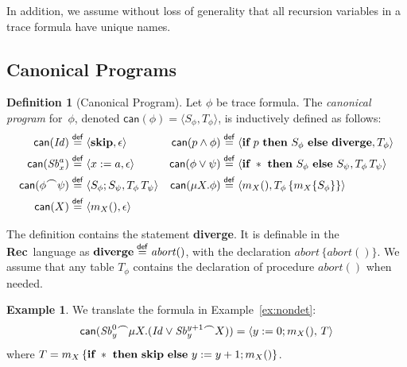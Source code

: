 \documentclass[10pt,a4paper]{amsart}
\theoremstyle{definition}
\newtheorem{definition}[theorem]{Definition}
\newtheorem{example}[theorem]{Example}
\newcommand{\defeq}{\stackrel{\mathsf{def}}{=}}
\newcommand{\fdenot}[1]{\left|\!\left|#1\right|\!\right|}
\newcommand{\chop}[0]{\raisebox{1ex}{$\frown$}}
\newcommand{\can}[1]{\mathsf{can} (#1)}
\newcommand{\Rec}{\mbox{\bf Rec}}
\newcommand{\Skip}{\mbox{\bf skip}}
\newcommand{\If}{\mbox{\bf if}}
\newcommand{\Then}{\mbox{\bf then}}
\newcommand{\Else}{\mbox{\bf else}}
\newcommand{\Any}{\mbox{\bf havoc}}
\newcommand{\Abort}{\mbox{\bf diverge}}
\begin{document}

In addition, we assume without loss of generality that all recursion
variables in a trace formula have unique names.


\subsection{Canonical Programs}
\label{sec:canonical-programs-1}

\begin{definition}[Canonical Program]
\label{def:can}
  Let $\phi$ be trace formula. The \emph{canonical program}
  for~$\phi$, denoted $\can{\phi}=\langle S_\phi,T_\phi\rangle$, is
  inductively defined as follows:
  \begin{align*}
    \can{\mathit{Id}} & \defeq \langle\Skip,\epsilon\rangle &
    \can{p\wedge\phi} & \defeq \langle\If\ p\ \Then\ S_\phi\ \Else\ \Abort,T_\phi\rangle \\
    \can{\mathit{Sb}^a_x} & \defeq \langle x:=a,\epsilon\rangle &
    \can{\phi\vee\psi} & \defeq \langle\If\ \ast\ \Then\ S_\phi\ \Else\ S_\psi,T_\phi\, T_\psi\rangle\\
    \can{\phi\chop\psi} & \defeq \langle S_\phi;S_\psi,T_\phi\, T_\psi\rangle &
    \can{\mu X.\phi} & \defeq \langle m_X(),T_\phi\,\{m_X \{S_\phi\}\}\rangle\\
    \can{X} & \defeq \langle m_X(),\epsilon\rangle
  \end{align*}
\end{definition}

The definition contains the statement
\Abort. %
It is definable in the \Rec\ language as
%
$\Abort \defeq \mathit{abort()}$, with the declaration
$\mathit{abort}\,\{\mathit{abort()}\}$.
%
We assume that any table $T_\phi$ contains the declaration of procedure
$\mathit{abort}()$ when needed.

\begin{example}
We translate the formula in Example~\ref{ex:nondet}: 
%
$$ \can{\mathit{Sb}_y^0\chop\mu X.(\mathit{Id}\lor\mathit{Sb}_y^{y+1}\chop X)} =
   \langle y:=0;m_X(),\,T\rangle $$
%
where $T=m_X\,\{\If\ \ast\ \Then\ \Skip\ \Else\ y:=y+1;m_X()\}$.
\end{example}
\end{document}
